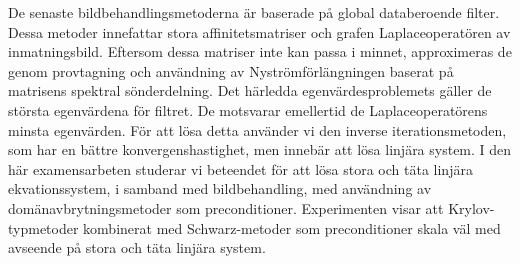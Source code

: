 De senaste bildbehandlingsmetoderna är baserade på global databeroende filter.
Dessa metoder innefattar stora affinitetsmatriser och grafen Laplaceoperatören av inmatningsbild.
Eftersom dessa matriser inte kan passa i minnet, approximeras de genom provtagning och användning av Nyströmförlängningen baserat på matrisens spektral sönderdelning.
Det härledda egenvärdesproblemets gäller de största egenvärdena för filtret.
De motsvarar emellertid de Laplaceoperatörens minsta egenvärden.
För att lösa detta använder vi den inverse iterationsmetoden, som har en bättre konvergenshastighet, men innebär att lösa linjära system.
I den här examensarbeten studerar vi beteendet för att lösa stora och täta linjära ekvationssystem, i samband med bildbehandling, med användning av domänavbrytningsmetoder som preconditioner.
Experimenten visar att Krylov-typmetoder kombinerat med Schwarz-metoder som preconditioner skala väl med avseende på stora och täta linjära system.
